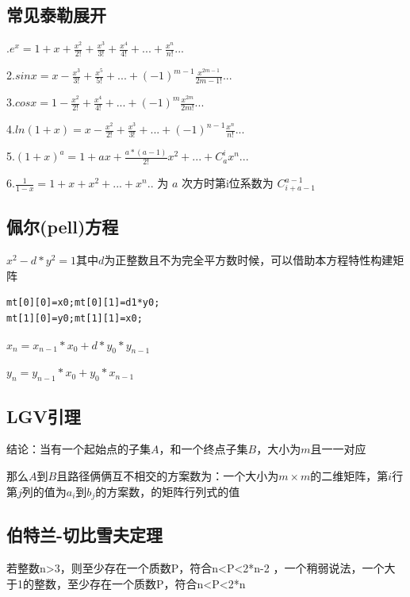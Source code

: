 \documentclass[12pt, a4paper, oneside]{ctexart}
\begin{document}
\subsection{常见泰勒展开}
.$e^x=1+x+{\frac{x^2}{2!}}+{\frac{x^3}{3!}}+{\frac{x^4}{4!}}+...+{\frac{x^n}{n!}}...$ \par
2.$sinx=x-{\frac{x^3}{3!}}+{\frac{x^5}{5!}}+...+(-1)^{m-1}{\frac{x^{2m-1}}{{2m-1}!}}...$ \par
3.$cosx=1-{\frac{x^2}{2!}}+{\frac{x^4}{4!}}+...+(-1)^{m}{\frac{x^{2m}}{{2m}!}}...$ \par
4.$ln(1+x)=x-{\frac{x^2}{2!}}+{\frac{x^3}{3!}}+...+(-1)^{n-1}{\frac{x^n}{n!}}...$ \par
5.${(1+x)^a=1+ax+{\frac{a*(a-1)}{2!}}}x^2+...+C_{a}^{i}x^n...$ \par
6.${\frac{1}{1-x}}=1+x+x^2+...+x^n.. $ 为 $a$ 次方时第i位系数为  $C_{i+a-1}^{a-1}$\par
\centering

\subsection{佩尔(pell)方程} 
\flushleft
${x^2-d*y^2=1}$其中${d}$为正整数且不为完全平方数时候，可以借助本方程特性构建矩阵\par
\begin{lstlisting}
mt[0][0]=x0;mt[0][1]=d1*y0;
mt[1][0]=y0;mt[1][1]=x0;
\end{lstlisting}
${x_n=x_{n-1}*x_0+d*y_0*y_{n-1}}$\par

${y_n=y_{n-1}*x_0+y_0*x_{n-1}}$\par
\centering

\subsection{LGV引理}
\flushleft
结论：当有一个起始点的子集${A}$，和一个终点子集${B}$，大小为${m}$且一一对应

那么${A}$到${B}$且路径俩俩互不相交的方案数为：一个大小为${m\times m}$的二维矩阵，第${i}$行第${j}$列的值为${a_i}$到${b_j}$的方案数，的矩阵行列式的值 \par
\centering

\subsection{伯特兰-切比雪夫定理} 
\flushleft
若整数n>3，则至少存在一个质数P，符合n<P<2*n-2 ，一个稍弱说法，一个大于1的整数，至少存在一个质数P，符合n<P<2*n \par
\centering
\end{document}
